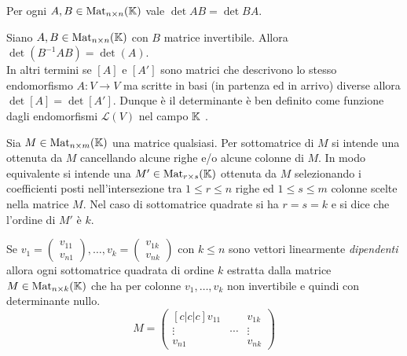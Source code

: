 \begin{corollary}
	Per ogni $ A, B \in \mathrm{Mat}_{n \times n} (\mathbb{K}) $ vale $ \det{AB} = \det{BA} $.
\end{corollary}

\begin{corollary}
	Siano $ A, B \in \mathrm{Mat}_{n \times n} (\mathbb{K}) $ con $ B $ matrice invertibile. Allora $ \det{(B^{-1} A B)} = \det{(A)} $. \\
	In altri termini se $ [A] $ e $ [A'] $ sono matrici che descrivono lo stesso endomorfismo $ A \colon V \to V $ ma scritte in basi (in partenza ed in arrivo) diverse allora $ \det{[A]} = \det{[A']} $. Dunque è il determinante è ben definito come funzione dagli endomorfismi $ \mathscr{L}(V) $ nel campo $ \mathbb{K} $ . 
\end{corollary}

\begin{definition}[sottomatrice]
	Sia $ M \in \mathrm{Mat}_{n \times m} (\mathbb{K}) $ una matrice qualsiasi. Per sottomatrice di $ M $ si intende una ottenuta da $ M $ cancellando alcune righe e/o alcune colonne di $ M $. In modo equivalente si intende una $ M' \in \mathrm{Mat}_{r \times s} (\mathbb{K}) $ ottenuta da $ M $ selezionando i coefficienti posti nell'intersezione tra $ 1 \leq r \leq n $ righe ed $ 1 \leq s \leq m $ colonne scelte nella matrice $ M $. Nel caso di sottomatrice quadrate si ha $ r = s = k $ e si dice che l'ordine di $ M' $ è $ k $. 
\end{definition}

\begin{prop}
	Se $ v_1 = \begin{pmatrix} v_{11} \\ v_{n1} \end{pmatrix}, \ldots, v_k = \begin{pmatrix} v_{1k} \\ v_{nk} \end{pmatrix} $ con $ k \leq n $ sono vettori linearmente \emph{dipendenti} allora ogni sottomatrice quadrata di ordine $ k $ estratta dalla matrice $ M \in \mathrm{Mat}_{n \times k} (\mathbb{K}) $ che ha per colonne $ v_1, \ldots, v_k $ non invertibile e quindi con determinante nullo. 
	\[M = \begin{pmatrix}[c|c|c]
	v_{11} & & v_{1k} \\
	\vdots & \cdots & \vdots \\
	v_{n1} & & v_{nk}
	\end{pmatrix}\]
\end{prop}

